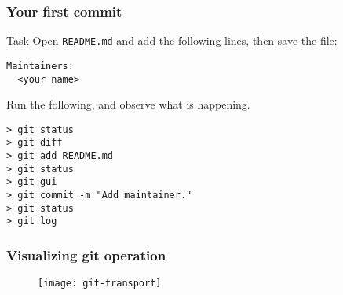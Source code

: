 
\begin{frame}[fragile]
	\frametitle{Your first commit}
	
	\begin{block}{Task}
	Open \texttt{README.md} and add the following lines, then save the file:
	\begin{verbatim}
Maintainers:
  <your name>
	\end{verbatim}
	\end{block}

Run the following, and observe what is happening.

	\begin{verbatim}
> git status
> git diff
> git add README.md
> git status
> git gui
> git commit -m "Add maintainer."
> git status
> git log
	\end{verbatim}
	
\end{frame}


\begin{frame}[fragile]
	\frametitle{Visualizing git operation}
	
	\begin{figure}
		\texttt{[image: git-transport]}
	\end{figure}
\end{frame}



